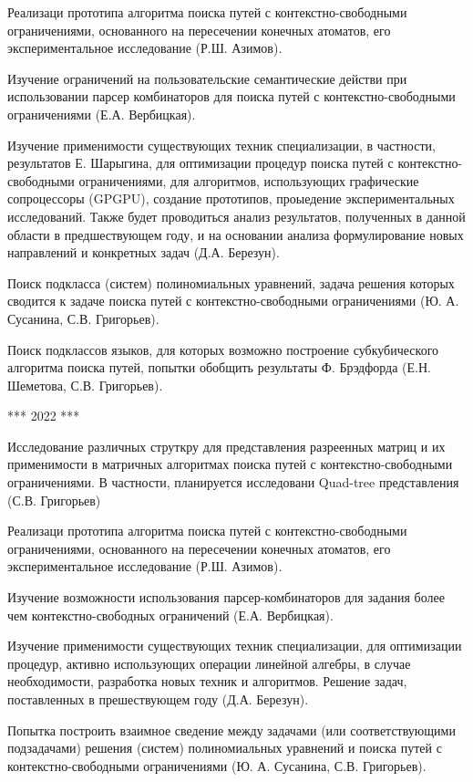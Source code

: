 \documentclass[12pt]{article}  %
\theoremstyle{remark}
\begin{document}
Реализаци прототипа алгоритма поиска путей с контекстно-свободными ограничениями, основанного на пересечении конечных атоматов, его экспериментальное исследование (Р.Ш. Азимов).

Изучение ограничений на пользовательские семантические действи при использовании парсер комбинаторов для поиска путей с контекстно-свободными ограничениями (Е.А. Вербицкая).

Изучение применимости существующих техник специализации, в частности, результатов Е. Шарыгина, для оптимизации процедур поиска путей с контекстно-свободными ограничениями, для алгоритмов, использующих графические сопроцессоры (GPGPU), создание прототипов, проыедение экспериментальных исследований. Также будет проводиться анализ результатов, полученных в данной области в предшествующем году, и на основании анализа формулирование новых направлений и конкретных задач (Д.А. Березун).

Поиск подкласса (систем) полиномиальных уравнений, задача решения которых сводится к задаче поиска путей с контекстно-свободными ограничениями (Ю. А. Сусанина, С.В. Григорьев).

Поиск подклассов языков, для которых возможно построение субкубического алгоритма поиска путей, попытки обобщить результаты Ф. Брэдфорда (Е.Н. Шеметова, С.В. Григорьев).


*** 2022 ***

Исследование различных струткру для представления разреенных матриц и их применимости в матричных алгоритмах поиска путей с контекстно-свободными ограничениями. В частности, планируется исследовани Quad-tree представления (С.В. Григорьев)

Реализаци прототипа алгоритма поиска путей с контекстно-свободными ограничениями, основанного на пересечении конечных атоматов, его экспериментальное исследование (Р.Ш. Азимов).

Изучение возможности использования парсер-комбинаторов для задания более чем контекстно-свободных ограничений (Е.А. Вербицкая).

Изучение применимости существующих техник специализации, для оптимизации процедур, активно использующих операции линейной алгебры, в случае необходимости, разработка новых техник и алгоритмов. Решение задач, поставленных в прешествующем году (Д.А. Березун).

Попытка построить взаимное сведение между задачами (или соответствующими подзадачами) решения (систем) полиномиальных уравнений и поиска путей с контекстно-свободными ограничениями (Ю. А. Сусанина, С.В. Григорьев).
\end{document}

